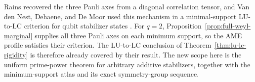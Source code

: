 Rains recovered the three Pauli axes from a diagonal correlation tensor,
and Van den Nest, Dehaene, and De Moor used this mechanism in a
minimal-support LU-to-LC criterion for qubit stabilizer states
\cite[Theorem~13]{Rains1999}
\cite[Theorem~1 and Corollary~1]{VanDenNestDehaeneDeMoor2005}.
For \(q=2\), Proposition~\ref{prop:full-weyl-marginal} supplies all three
Pauli axes on each minimum support, so the AME profile satisfies their
criterion.  The LU-to-LC conclusion of
Theorem~\ref{thm:lu-lc-rigidity} is therefore already covered by their
result.  The new scope here is the uniform
prime-power theorem for arbitrary additive stabilizers, together with the
minimum-support atlas and its exact symmetry-group sequence.
